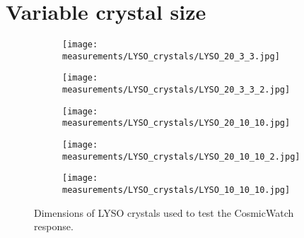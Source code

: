 \section{Variable crystal size}\label{sec:LYSO_size}

\begin{figure}
  \begin{subfigure}[t]{0.49\textwidth}
    \centering
    \texttt{[image: measurements/LYSO\_crystals/LYSO\_20\_3\_3.jpg]}
  \end{subfigure}
  \begin{subfigure}[t]{0.49\textwidth}
    \centering
    \texttt{[image: measurements/LYSO\_crystals/LYSO\_20\_3\_3\_2.jpg]}
  \end{subfigure}
  \medskip
  \begin{subfigure}[t]{0.49\textwidth}
    \centering
    \texttt{[image: measurements/LYSO\_crystals/LYSO\_20\_10\_10.jpg]}
  \end{subfigure}
  \begin{subfigure}[t]{0.49\textwidth}
    \centering
    \texttt{[image: measurements/LYSO\_crystals/LYSO\_20\_10\_10\_2.jpg]}
  \end{subfigure}
  \medskip
  \begin{subfigure}[t]{\textwidth}
    \centering
    \texttt{[image: measurements/LYSO\_crystals/LYSO\_10\_10\_10.jpg]}
  \end{subfigure}
  \caption{\label{fig:LYSO_crystals}Dimensions of LYSO crystals used to test the CosmicWatch response.}
\end{figure}